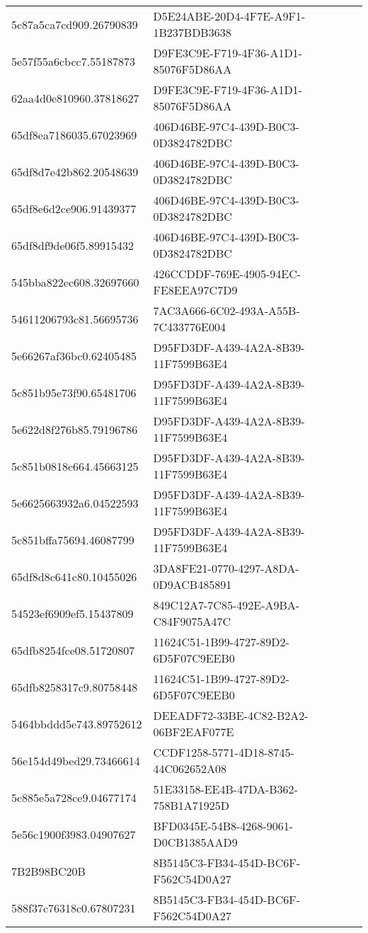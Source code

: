\begin{tabular}{ll}
5c87a5ca7cd909.26790839 & D5E24ABE-20D4-4F7E-A9F1-1B237BDB3638 \\
5e57f55a6cbcc7.55187873 & D9FE3C9E-F719-4F36-A1D1-85076F5D86AA \\
62aa4d0e810960.37818627 & D9FE3C9E-F719-4F36-A1D1-85076F5D86AA \\
65df8ea7186035.67023969 & 406D46BE-97C4-439D-B0C3-0D3824782DBC \\
65df8d7e42b862.20548639 & 406D46BE-97C4-439D-B0C3-0D3824782DBC \\
65df8e6d2ce906.91439377 & 406D46BE-97C4-439D-B0C3-0D3824782DBC \\
65df8df9de06f5.89915432 & 406D46BE-97C4-439D-B0C3-0D3824782DBC \\
545bba822ec608.32697660 & 426CCDDF-769E-4905-94EC-FE8EEA97C7D9 \\
54611206793c81.56695736 & 7AC3A666-6C02-493A-A55B-7C433776E004 \\
5e66267af36bc0.62405485 & D95FD3DF-A439-4A2A-8B39-11F7599B63E4 \\
5c851b95e73f90.65481706 & D95FD3DF-A439-4A2A-8B39-11F7599B63E4 \\
5e622d8f276b85.79196786 & D95FD3DF-A439-4A2A-8B39-11F7599B63E4 \\
5c851b0818c664.45663125 & D95FD3DF-A439-4A2A-8B39-11F7599B63E4 \\
5e6625663932a6.04522593 & D95FD3DF-A439-4A2A-8B39-11F7599B63E4 \\
5c851bffa75694.46087799 & D95FD3DF-A439-4A2A-8B39-11F7599B63E4 \\
65df8d8c641c80.10455026 & 3DA8FE21-0770-4297-A8DA-0D9ACB485891 \\
54523ef6909ef5.15437809 & 849C12A7-7C85-492E-A9BA-C84F9075A47C \\
65dfb8254fce08.51720807 & 11624C51-1B99-4727-89D2-6D5F07C9EEB0 \\
65dfb8258317c9.80758448 & 11624C51-1B99-4727-89D2-6D5F07C9EEB0 \\
5464bbddd5e743.89752612 & DEEADF72-33BE-4C82-B2A2-06BF2EAF077E \\
56e154d49bed29.73466614 & CCDF1258-5771-4D18-8745-44C062652A08 \\
5c885e5a728ce9.04677174 & 51E33158-EE4B-47DA-B362-758B1A71925D \\
5e56c1900f3983.04907627 & BFD0345E-54B8-4268-9061-D0CB1385AAD9 \\
7B2B98BC20B & 8B5145C3-FB34-454D-BC6F-F562C54D0A27 \\
588f37c76318c0.67807231 & 8B5145C3-FB34-454D-BC6F-F562C54D0A27 \\

\end{tabular}
